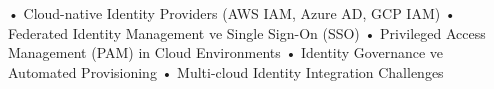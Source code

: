 • Cloud-native Identity Providers (AWS IAM, Azure AD, GCP IAM)
• Federated Identity Management ve Single Sign-On (SSO)
• Privileged Access Management (PAM) in Cloud Environments
• Identity Governance ve Automated Provisioning
• Multi-cloud Identity Integration Challenges